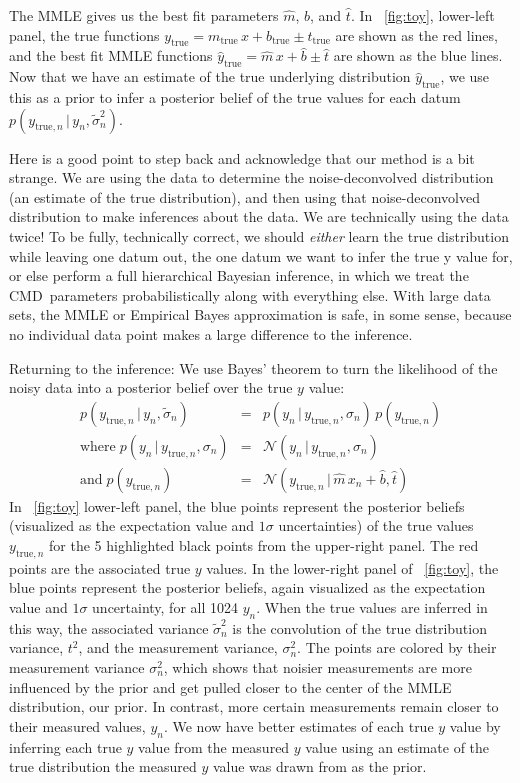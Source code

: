\documentclass[modern]{aastex61}
\newcommand{\acronym}[1]{{\small{#1}}}
\newcommand{\cmd}{\acronym{CMD}}
\newcommand{\given}{\,|\,}
\newcommand{\true}{\mathrm{true}}
\begin{document}
The MMLE gives us the best fit parameters $\hat{m}$, $\hat{b}$, and $\hat{t}$. In \figurename~\ref{fig:toy}, lower-left panel, the true functions $y_{\true} = m_{\true}\,x + b_{\true} \pm t_{\true}$ are shown as the red lines, and the best fit MMLE functions $\hat{y}_{\true} = \hat{m}\, x + \hat{b} \pm \hat{t}$ are shown as the blue lines. Now that we have an estimate of the true underlying distribution $\hat{y}_{\true}$, we use this as a prior to infer a posterior belief of the true values for each datum $p(y_{\true,n} \given y_n, \tilde{\sigma}_n^2)$.

Here is a good point to step back and acknowledge that our method is a
bit strange. We are using the data to determine the
noise-deconvolved distribution (an estimate of the true
distribution), and then using that noise-deconvolved distribution to
make inferences about the data. We are technically using the data
twice! To be fully, technically correct, we should \emph{either} learn the true
distribution while leaving one datum out, the one datum we want to
infer the true y value for, or else perform a full hierarchical Bayesian inference,
in which we treat the \cmd\ parameters probabilistically along with everything else.
With large data sets, the MMLE or Empirical Bayes approximation is safe,
in some sense, because no individual data point makes a large difference to
the inference.

Returning to the inference:
We use Bayes' theorem to turn the likelihood of the noisy data into a posterior belief over the true $y$ value:
\begin{eqnarray}
p(y_{\true,n} \given y_n, \tilde{\sigma}_n) &=& p(y_n \given y_{\true,n}, \sigma_n)\,p(y_{\true,n}) \\
\mathrm{where}\;p(y_n \given y_{\true,n}, \sigma_n) &=& \mathcal{N}(y_n \given y_{\true,n}, \sigma_n) \\
\mathrm{and}\;p(y_{\true,n}) &=& \mathcal{N}(y_{\true,n} \given \hat{m}\, x_n + \hat{b}, \hat{t})
\label{eq:toyBayes}
\end{eqnarray}
In \figurename~\ref{fig:toy} lower-left panel, the blue points represent the posterior beliefs (visualized as the expectation value and $1\sigma$ uncertainties) of the true values $y_{\true,n}$ for the 5 highlighted black points from the upper-right panel. The red points are the associated true $y$ values.
In the lower-right panel of \figurename~\ref{fig:toy}, the blue points represent the posterior beliefs, again visualized as the expectation value and $1\sigma$ uncertainty, for all 1024 $y_n$.
When the true values are inferred in this way, the associated variance $\tilde{\sigma}_n^2$ is the convolution of the true distribution variance, $t^2$, and the measurement variance, $\sigma_n^2$.
The points are colored by their measurement variance $\sigma_n^2$, which shows that noisier measurements are more influenced by the prior and get pulled closer to the center of the MMLE distribution, our prior. In contrast, more certain measurements remain closer to their measured values, $y_n$. We now have better estimates of each true $y$ value by inferring each true $y$ value from the measured $y$ value using an estimate of the true distribution the measured $y$ value was drawn from as the prior.
\end{document}
